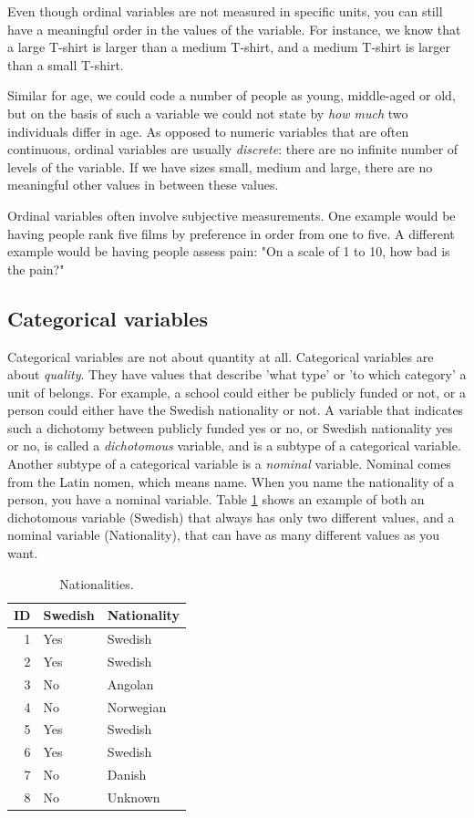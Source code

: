 \documentclass[]{report}\usepackage[]{graphicx}\usepackage[]{color}
\begin{document}
Even though ordinal variables are not measured in specific units, you can still have a meaningful order in the values of the variable. For instance, we know that a large T-shirt is larger than a medium T-shirt, and a medium T-shirt is larger than a small T-shirt.

Similar for age, we could code a number of people as young, middle-aged or old, but on the basis of such a variable we could not state by \textit{how much} two individuals differ in age. As opposed to numeric variables that are often continuous, ordinal variables are usually \textit{discrete}: there are no infinite number of levels of the variable. If we have sizes small, medium and large, there are no meaningful other values in between these values.

Ordinal variables often involve subjective measurements. One example would be having people rank five films by preference in order from one to five. A different example would be having people assess pain: "On a scale of 1 to 10, how bad is the pain?"

\subsection{Categorical variables}

Categorical variables are not about quantity at all. Categorical variables are about \textit{quality}. They have values that describe 'what type' or 'to which category' a unit of belongs. For example, a school could either be publicly funded or not, or a person could either have the Swedish nationality or not. A variable that indicates such a dichotomy between publicly funded yes or no, or Swedish nationality yes or no, is called a \textit{dichotomous} variable, and is a subtype of a categorical variable. Another subtype of a categorical variable is a \textit{nominal} variable. Nominal comes from the Latin nomen, which means name. When you name the nationality of a person, you have a nominal variable. Table \ref{tab:data_9} shows an example of both an dichotomous variable (Swedish) that always has only two different values, and a nominal variable (Nationality), that can have as many different values as you want.

\begin{table}[ht]
\centering
\caption{Nationalities.} 
\label{tab:data_9}
\begin{tabular}{rll}
  \hline
ID & Swedish & Nationality \\ 
  \hline
1 & Yes & Swedish \\ 
  2 & Yes & Swedish \\ 
  3 & No & Angolan \\ 
  4 & No & Norwegian \\ 
  5 & Yes & Swedish \\ 
  6 & Yes & Swedish \\ 
  7 & No & Danish \\ 
  8 & No & Unknown \\ 
   \hline
\end{tabular}
\end{table}
\end{document}
